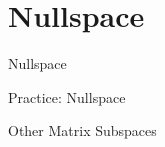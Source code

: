 \section{Nullspace}

\begin{frame}{Nullspace}

\end{frame}

\begin{frame}{Practice: Nullspace}

\end{frame}

\begin{frame}{Other Matrix Subspaces}

\end{frame}

